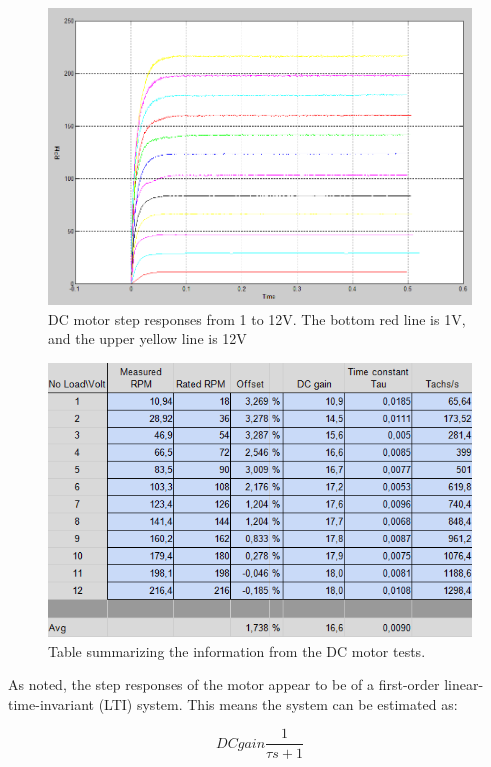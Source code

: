 \begin{figure}[h!]
\centering
\includegraphics[scale=0.4]{Billeder/Stepresponses1to12V.png}
\caption{DC motor step responses from 1 to 12V. The bottom red line is 1V, and the upper yellow line is 12V}
\label{fig:stepresponses1to12V}
\end{figure}

\begin{figure}[h!]
\centering
\includegraphics[scale=0.7]{Billeder/StepResponseData}
\caption{Table summarizing the information from the DC motor tests.}
\label{fig:StepResponseData}
\end{figure}

As noted, the step responses of the motor appear to be of a first-order linear-time-invariant (LTI) system. This means the system can be estimated as:

\begin{equation}
DCgain\frac{1}{\tau s+1}
\end{equation}

